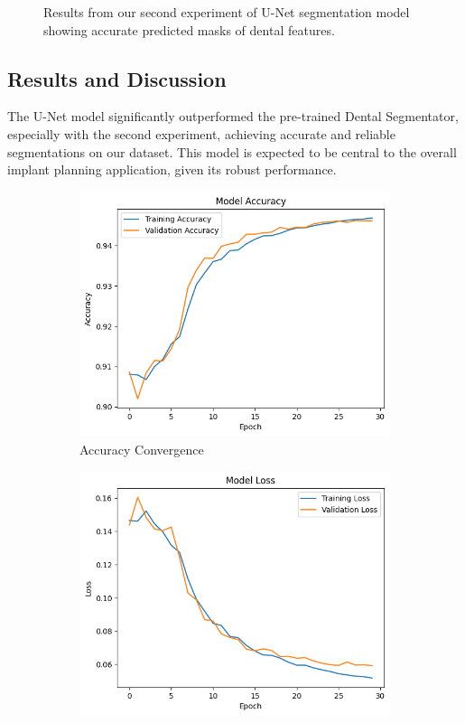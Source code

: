 \documentclass[12pt]{article}
\begin{document}
\begin{itemize}
\begin{figure}[H]
    \caption{Results from our second experiment of U-Net segmentation model showing accurate predicted masks of dental features.}
    \label{fig:enter-label}
\end{figure}
\end{itemize}

\subsection{Results and Discussion}
The U-Net model significantly outperformed the pre-trained Dental Segmentator, especially with the second experiment, achieving accurate and reliable segmentations on our dataset. This model is expected to be central to the overall implant planning application, given its robust performance.

\begin{figure}[htbp]
    \centering
    \begin{subfigure}[b]{0.45\textwidth}
        \centering
        \includegraphics[width=\textwidth]{unet_accuracy.png}
        \caption{Accuracy Convergence}
        \label{fig:image1}
    \end{subfigure}
    \hfill
    \begin{subfigure}[b]{0.45\textwidth}
        \centering
        \includegraphics[width=\textwidth]{unet_loss.png}

\end{subfigure}
\end{figure}
\end{document}
